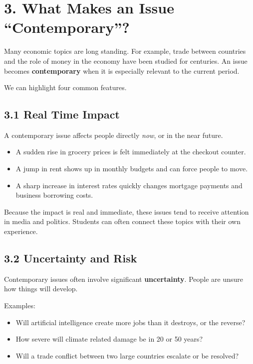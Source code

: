 \documentclass[12pt]{article}
\begin{document}
\section*{3. What Makes an Issue ``Contemporary''?}

Many economic topics are long standing. For example, trade between countries and the role of money in the economy have been studied for centuries. An issue becomes \textbf{contemporary} when it is especially relevant to the current period.

We can highlight four common features.

\subsection*{3.1 Real Time Impact}

A contemporary issue affects people directly \emph{now}, or in the near future.

\begin{itemize}[noitemsep]
    \item A sudden rise in grocery prices is felt immediately at the checkout counter.
    \item A jump in rent shows up in monthly budgets and can force people to move.
    \item A sharp increase in interest rates quickly changes mortgage payments and business borrowing costs.
\end{itemize}

Because the impact is real and immediate, these issues tend to receive attention in media and politics. Students can often connect these topics with their own experience.

\subsection*{3.2 Uncertainty and Risk}

Contemporary issues often involve significant \textbf{uncertainty}. People are unsure how things will develop.

Examples:

\begin{itemize}[noitemsep]
    \item Will artificial intelligence create more jobs than it destroys, or the reverse?
    \item How severe will climate related damage be in 20 or 50 years?
    \item Will a trade conflict between two large countries escalate or be resolved?
\end{itemize}
\end{document}
